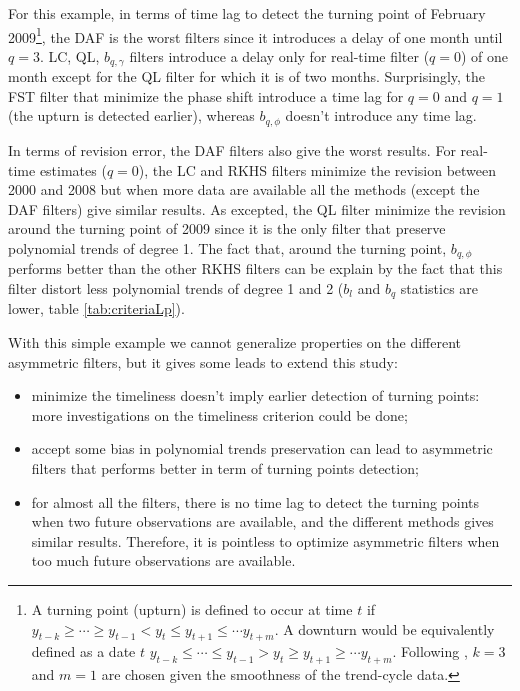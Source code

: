\documentclass[
  12pt,
  ,
  a4paper]{article}
\newcommand\1{\mathds{1}}
\begin{document}
For this example, in terms of time lag to detect the turning point of February 2009\footnote{A turning point (upturn) is defined to occur at time \(t\) if \(y_{t-k}\geq\cdots\geq y_{t-1}<y_t\leq y_{t+1}\leq\cdots y_{t+m}\).
  A downturn would be equivalently defined as a date \(t\) \(y_{t-k}\leq\cdots\leq y_{t-1}>y_t\geq y_{t+1}\geq\cdots y_{t+m}\).
  Following \textcite{Zellner1991}, \(k=3\) and \(m=1\) are chosen given the smoothness of the trend-cycle data. }, the DAF is the worst filters since it introduces a delay of one month until \(q=3\).
LC, QL, \(b_{q,\gamma}\) filters introduce a delay only for real-time filter (\(q=0\)) of one month except for the QL filter for which it is of two months.
Surprisingly, the FST filter that minimize the phase shift introduce a time lag for \(q=0\) and \(q=1\) (the upturn is detected earlier), whereas \(b_{q,\phi}\) doesn't introduce any time lag.

In terms of revision error, the DAF filters also give the worst results.
For real-time estimates (\(q=0\)), the LC and RKHS filters minimize the revision between 2000 and 2008 but when more data are available all the methods (except the DAF filters) give similar results.
As excepted, the QL filter minimize the revision around the turning point of 2009 since it is the only filter that preserve polynomial trends of degree 1.
The fact that, around the turning point, \(b_{q,\phi}\) performs better than the other RKHS filters can be explain by the fact that this filter distort less polynomial trends of degree 1 and 2 (\(b_l\) and \(b_q\) statistics are lower, table \ref{tab:criteriaLp}).

With this simple example we cannot generalize properties on the different asymmetric filters, but it gives some leads to extend this study:

\begin{itemize}
\item
  minimize the timeliness doesn't imply earlier detection of turning points: more investigations on the timeliness criterion could be done;
\item
  accept some bias in polynomial trends preservation can lead to asymmetric filters that performs better in term of turning points detection;
\item
  for almost all the filters, there is no time lag to detect the turning points when two future observations are available, and the different methods gives similar results.
  Therefore, it is pointless to optimize asymmetric filters when too much future observations are available.
\end{itemize}
\end{document}
